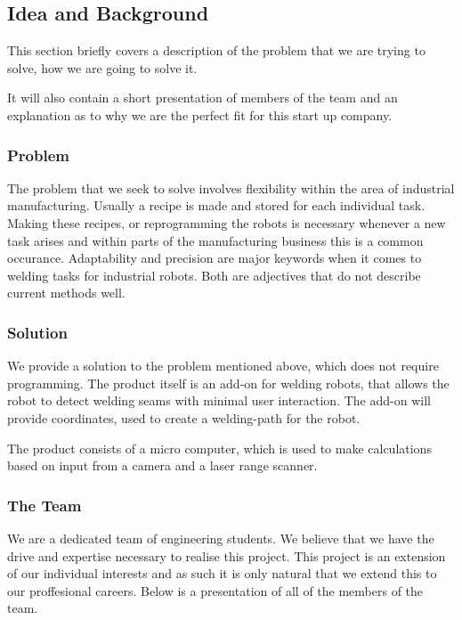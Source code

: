 \subsection{Idea and Background}
This section briefly covers a description of the problem that we are trying to solve, how we are going to solve it.

It will also contain a short presentation of members of the team and an explanation as to why we are the perfect fit for this start up company.

\subsubsection{Problem}
The problem that we seek to solve involves flexibility within the area of industrial manufacturing. Usually a recipe is made and stored for each individual task.
Making these recipes, or reprogramming the robots is necessary whenever a new task arises and within parts of the manufacturing business this is a common occurance. 
Adaptability and precision are major keywords when it comes to welding tasks for industrial robots. Both are adjectives that do not describe current methods well.

\subsubsection{Solution}
We provide a solution to the problem mentioned above, which does not require programming. The product itself is an add-on for welding robots, that allows the robot to detect welding seams with minimal user interaction. The add-on will provide coordinates, used to create a welding-path for the robot. 

The product consists of a micro computer, which is used to make calculations based on input from a camera and a laser range scanner. 

\subsubsection{The Team}
We are a dedicated team of engineering students. We believe that we have the drive and expertise necessary to realise this project. This project is an extension of our individual interests and as such it is only natural that we extend this to our proffesional careers. Below is a presentation of all of the members of the team.

